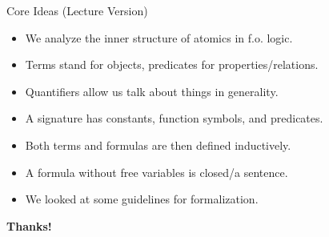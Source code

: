 \begin{frame}{Core Ideas (Lecture Version)}

	\begin{itemize}%
	\itemsep=12pt
	
		\item We analyze the inner structure of atomics in f.o. logic.
		
		\item  Terms stand for objects, predicates for properties/relations.
		
		\item Quantifiers allow us talk about things in generality.
		
		\item A signature has constants, function symbols, and predicates.
		
		\item Both terms and formulas are then defined inductively.
		
		\item A formula without free variables is closed/a sentence.
		
		\item We looked at some guidelines for formalization.
					
	\end{itemize}

\end{frame}


\begin{frame}

	\begin{center}
	{\huge\bf Thanks!}
	\end{center}

\end{frame}
